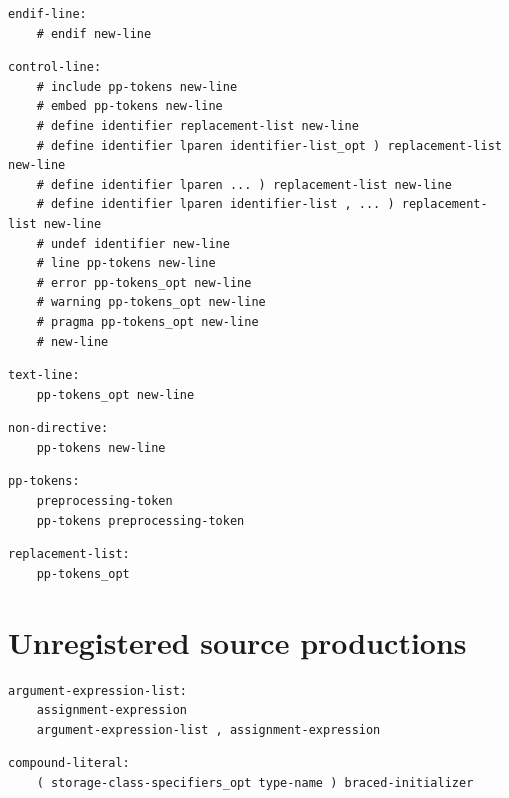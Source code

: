 \noindent\textbf{\texttt{}}\par
\begin{lstlisting}
endif-line:
    # endif new-line
\end{lstlisting}

\noindent\textbf{\texttt{}}\par
\begin{lstlisting}
control-line:
    # include pp-tokens new-line
    # embed pp-tokens new-line
    # define identifier replacement-list new-line
    # define identifier lparen identifier-list_opt ) replacement-list new-line
    # define identifier lparen ... ) replacement-list new-line
    # define identifier lparen identifier-list , ... ) replacement-list new-line
    # undef identifier new-line
    # line pp-tokens new-line
    # error pp-tokens_opt new-line
    # warning pp-tokens_opt new-line
    # pragma pp-tokens_opt new-line
    # new-line
\end{lstlisting}

\noindent\textbf{\texttt{}}\par
\begin{lstlisting}
text-line:
    pp-tokens_opt new-line
\end{lstlisting}

\noindent\textbf{\texttt{}}\par
\begin{lstlisting}
non-directive:
    pp-tokens new-line
\end{lstlisting}

\noindent\textbf{\texttt{}}\par
\begin{lstlisting}
pp-tokens:
    preprocessing-token
    pp-tokens preprocessing-token
\end{lstlisting}

\noindent\textbf{\texttt{}}\par
\begin{lstlisting}
replacement-list:
    pp-tokens_opt
\end{lstlisting}

\section{Unregistered source productions}

\noindent\textbf{\texttt{}}\par
\begin{lstlisting}
argument-expression-list:
    assignment-expression
    argument-expression-list , assignment-expression
\end{lstlisting}

\noindent\textbf{\texttt{}}\par
\begin{lstlisting}
compound-literal:
    ( storage-class-specifiers_opt type-name ) braced-initializer
\end{lstlisting}

